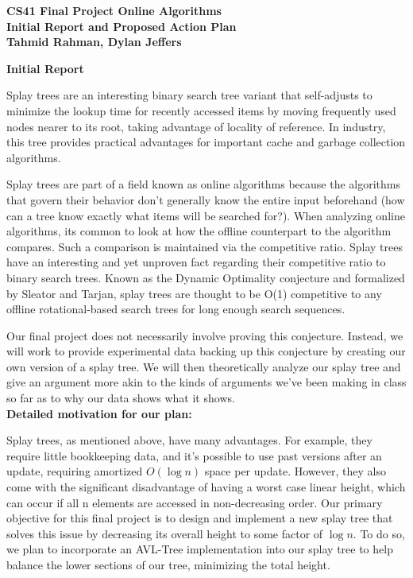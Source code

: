 \documentclass[11pt]{article}
\begin{document}
\begin{center}
{\Large \textbf{CS41 Final Project Online Algorithms}}\\
{\large \textbf{Initial Report and Proposed Action Plan}} \\
\textbf{Tahmid Rahman, Dylan Jeffers}
\end{center}
\vspace{4 mm}

{\textbf{Initial Report}}

\vspace{2mm}
Splay trees are an interesting binary search tree variant that 
self-adjusts to minimize the lookup time for recently accessed items by moving frequently used nodes nearer to its root, taking 
advantage of locality of reference. In industry, this tree provides 
practical advantages for important cache and garbage collection
algorithms. 

Splay trees are part of a field known as online algorithms because the 
algorithms that govern their behavior don’t generally know the entire 
input beforehand (how can a tree know exactly what items will be 
searched for?). When analyzing online algorithms, its common to 
look at how the offline counterpart to the algorithm compares. 
Such a comparison is maintained via the competitive ratio. Splay 
trees have an interesting and yet unproven fact regarding their 
competitive ratio to binary search trees. Known as the Dynamic 
Optimality conjecture and formalized by Sleator and Tarjan, 
splay trees are thought to be O(1) competitive 
to any offline rotational-based search trees for long enough 
search sequences.   

Our final project does not necessarily involve proving this 
conjecture. Instead, we will work to provide experimental 
data backing up this conjecture by creating our own 
version of a splay tree. We will then theoretically analyze 
our splay tree and give an argument more akin to the 
kinds of arguments we’ve been making in class so far 
as to why our data shows what it shows.\\

\textbf{Detailed motivation for our plan:}
\vspace{2mm}

Splay trees, as mentioned above, have many advantages.
For example, they require little bookkeeping data, and it's
possible to use past versions after an update, requiring amortized
$O(\log n)$ space per update. However, they also come
with the significant disadvantage of having a worst case linear height, 
which can occur if all n elements are accessed in
non-decreasing order. Our primary objective for this final project is to
design and implement a new splay tree that solves this issue by decreasing
its overall height to some factor of $\log n$. To do so, we plan to incorporate an
AVL-Tree implementation into our splay tree to help balance the lower 
sections of our tree, minimizing the total height.\\
\end{document}
